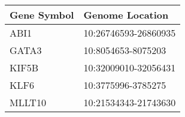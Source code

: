 \begin{tabular}{ll}
\toprule
Gene Symbol &      Genome Location \\
\midrule
       ABI1 & 10:26746593-26860935 \\
      GATA3 &   10:8054653-8075203 \\
      KIF5B & 10:32009010-32056431 \\
       KLF6 &   10:3775996-3785275 \\
     MLLT10 & 10:21534343-21743630 \\
\bottomrule
\end{tabular}
